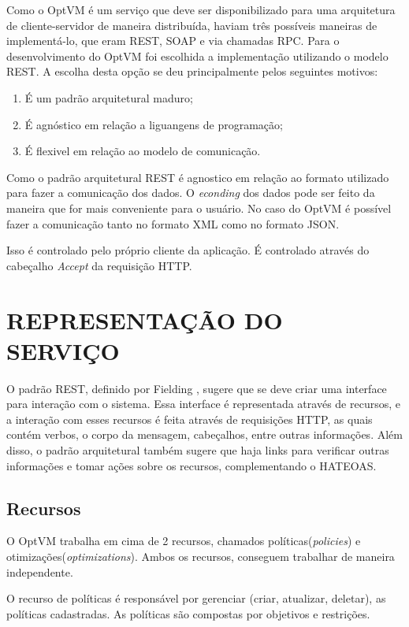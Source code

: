 Como o OptVM é um serviço que deve ser disponibilizado para uma arquitetura de 
cliente-servidor de maneira distribuída, haviam três possíveis maneiras de implementá-lo, 
que eram REST, SOAP e via chamadas RPC. 
Para o desenvolvimento do OptVM foi escolhida a implementação utilizando o modelo REST. 
A escolha desta opção se deu principalmente pelos seguintes motivos:

\begin{enumerate}
\item É um padrão arquitetural maduro;
\item É agnóstico em relação a liguangens de programação;
\item É flexivel em relação ao modelo de comunicação.
\end{enumerate}

Como o padrão arquitetural REST é agnostico em relação ao formato utilizado para fazer a comunicação dos dados. O \textit{econding} 
dos dados pode ser feito da maneira que for mais conveniente para o usuário. No caso do OptVM é possível fazer a comunicação
tanto no formato XML como no formato JSON.

Isso é controlado pelo próprio cliente da aplicação. É controlado através do cabeçalho \textit{Accept}
da requisição HTTP.

\section{REPRESENTAÇÃO DO SERVIÇO}

O padrão REST, definido por Fielding \cite{fielding}, sugere que se deve criar uma interface para interação com o sistema. 
Essa interface é representada através de recursos, e a interação com esses recursos é feita através de requisições HTTP, 
as quais contém verbos, o corpo da mensagem, cabeçalhos, entre outras informações. Além disso, o padrão arquitetural também sugere que 
haja links para verificar outras informações e tomar ações sobre os recursos, complementando o HATEOAS.

\subsection{Recursos}

O OptVM trabalha em cima de 2 recursos, chamados políticas(\textit{policies}) e otimizações(\textit{optimizations}). 
Ambos os recursos, conseguem trabalhar de maneira independente.

O recurso de políticas é responsável por gerenciar (criar, atualizar, deletar), as políticas
cadastradas. As políticas são compostas por objetivos e restrições. 

